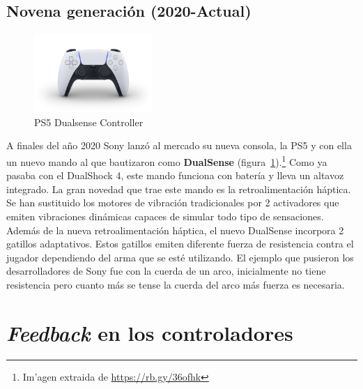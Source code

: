 
\subsection{Novena generaci\'on (2020-Actual)}

\begin{figure}[t]
\centering
\includegraphics[width=0.4\textwidth]{./Imagenes/Bitmap/dualsense.jpg}
\caption{PS5 Dualsense Controller}
\label{Fig:dualsense}
\end{figure}

A finales del a\~no 2020 Sony lanz\'o al mercado su nueva consola, la PS5 y con ella un nuevo mando al que bautizaron como \textbf{DualSense} (figura~\ref{Fig:dualsense}).\footnote{Im'agen extraida de \url{https://rb.gy/36ofhk}} Como ya pasaba con el DualShock 4, este mando funciona con bater\'ia y lleva un altavoz integrado. La gran novedad que trae este mando es la retroalimentaci\'on h\'aptica. Se han sustituido los motores de vibraci\'on tradicionales por 2 activadores que emiten vibraciones din\'amicas capaces de simular todo tipo de sensaciones. Adem\'as de la nueva retroalimentaci\'on h\'aptica, el nuevo DualSense incorpora 2 gatillos adaptativos. Estos gatillos emiten diferente fuerza de resistencia contra el jugador dependiendo del arma que se est\'e utilizando. El ejemplo que pusieron los desarrolladores de Sony fue con la cuerda de un arco, inicialmente no tiene resistencia pero cuanto m\'as se tense la cuerda del arco m\'as fuerza es necesaria.

\section{\textit{Feedback} en los controladores}

